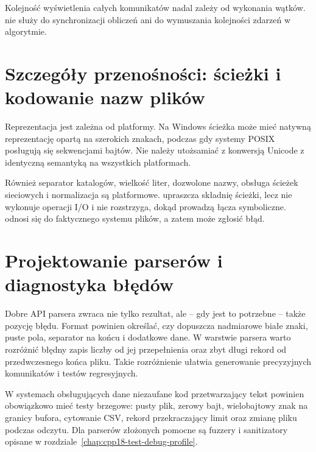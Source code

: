 Kolejność wyświetlenia całych komunikatów nadal zależy od wykonania
wątków.  nie służy do synchronizacji obliczeń ani
do wymuszania kolejności zdarzeń w algorytmie.

\section{Szczegóły przenośności: ścieżki i kodowanie nazw plików}

Reprezentacja  jest zależna od platformy.
Na Windows ścieżka może mieć natywną reprezentację opartą na szerokich
znakach, podczas gdy systemy POSIX posługują się sekwencjami bajtów.
Nie należy utożsamiać  z konwersją Unicode
z identyczną semantyką na wszystkich platformach.

Również separator katalogów, wielkość liter, dozwolone nazwy,
obsługa ścieżek sieciowych i normalizacja są platformowe.
 upraszcza składnię ścieżki, lecz
nie wykonuje operacji I/O i nie rozstrzyga, dokąd prowadzą łącza
symboliczne.  odnosi się do faktycznego systemu
plików, a zatem może zgłosić błąd.

\section{Projektowanie parserów i diagnostyka błędów}

Dobre API parsera zwraca nie tylko rezultat, ale -- gdy jest to
potrzebne -- także pozycję błędu. Format powinien określać,
czy dopuszcza nadmiarowe białe znaki, puste pola, separator na końcu
i dodatkowe dane. W warstwie parsera warto rozróżnić błędny zapis
liczby od jej przepełnienia oraz zbyt długi rekord od przedwczesnego
końca pliku. Takie rozróżnienie ułatwia generowanie precyzyjnych
komunikatów i testów regresyjnych.

W systemach obsługujących dane niezaufane kod przetwarzający tekst
powinien obowiązkowo mieć testy brzegowe: pusty plik, zerowy bajt,
wielobajtowy znak na granicy bufora, cytowanie CSV, rekord przekraczający
limit oraz zmianę pliku podczas odczytu. Dla parserów złożonych
pomocne są fuzzery i sanitizatory opisane w rozdziale~\ref{chap:cpp18-test-debug-profile}.


